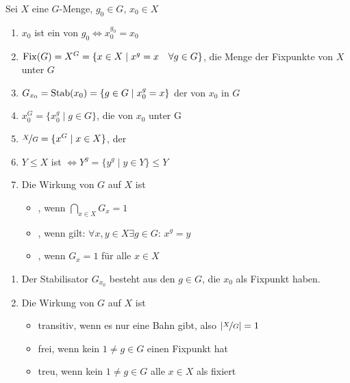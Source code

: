 \begin{definition}
	Sei $X$ eine $G$-Menge, $g_0\in G$, $x_0\in X$
	\begin{enumerate}[label=(\alph*)]
		\item $x_0$ ist ein  von $g_0\Leftrightarrow x_0^{g_0}=x_0$
		\item $\operatorname{Fix}(G) = X^G = \{x\in X\mid x^g=x\quad\forall g\in G\}$, die Menge der Fixpunkte von $X$ unter $G$
		\item $G_{x_0} = \operatorname{Stab}(x_0) = \{g\in G\mid x_0^g = x\}$ der  von $x_0$ in $G$
		\item $x_0^G = \{x_0^g \mid g\in G\}$, die  von $x_0$ unter G
		\item $\nicefrac{X}{G} = \{x^G\mid x\in X\}$, der 
		\item $Y\le X$ ist  $\Leftrightarrow Y^g = \{y^g\mid y\in Y\}\le Y$
		\item Die Wirkung von $G$ auf $X$ ist
		\begin{itemize}
			\item {}, wenn $\bigcap_{x\in X} G_x=1$
			\item {}, wenn gilt: $\forall x,y\in X\exists g\in G$: $x^g=y$
			\item {}, wenn $G_x=1$ für alle $x\in X$
		\end{itemize}
	\end{enumerate}
\end{definition}

\begin{remark}
	\begin{enumerate}[label=(\alph*)]
		\item Der Stabilisator $G_{x_0}$ besteht aus den $g\in G$, die $x_0$ als Fixpunkt haben.
		\item Die Wirkung von $G$ auf $X$ ist
		\begin{itemize}
			\item transitiv, wenn es nur eine Bahn gibt, also $\vert\nicefrac{X}{G}\vert = 1$
			\item frei, wenn kein $1\neq g\in G$ einen Fixpunkt hat
			\item treu, wenn kein $1\neq g\in G$ alle $x\in X$ als fixiert
		\end{itemize}
	\end{enumerate}
\end{remark}

